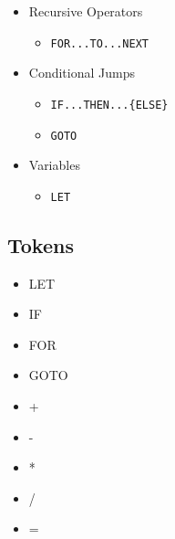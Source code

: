 \documentclass{report}
\begin{document}
\begin{multicols}{2}
\begin{itemize}
	\item Recursive Operators
		\begin{itemize}
			\item \texttt{FOR...TO...NEXT}
		\end{itemize}
	\item Conditional Jumps 
		\begin{itemize}
			\item \texttt{IF...THEN...\{ELSE\}}
			\item \texttt{GOTO}
		\end{itemize}	
	\item Variables
		\begin{itemize}
			\item \texttt{LET}
		\end{itemize}
\end{itemize}
\columnbreak
\subsection*{Tokens}
\begin{itemize}
	\item LET
	\item IF 
	\item FOR 
	\item GOTO
	\item +
	\item -
	\item *
	\item /
	\item =
\end{itemize}

\end{multicols}
\end{document}
